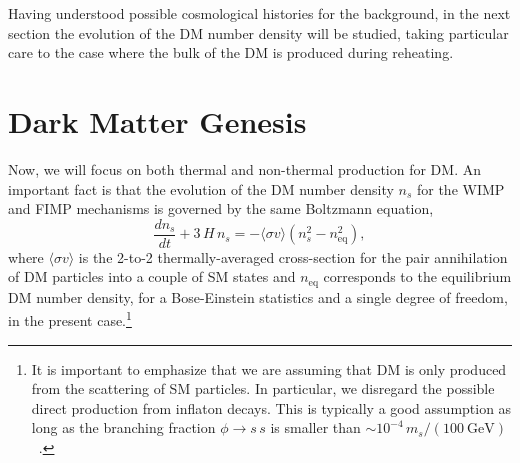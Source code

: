 \documentclass[a4paper,11pt]{article}
\newcommand{\mdm}{m_s}
\newcommand{\sv}{\langle\sigma v\rangle}
\begin{document}
Having understood possible cosmological histories for the background, in the next section the evolution of the DM number density will be studied, taking particular care to the case where the bulk of the DM is produced during reheating.

\section{Dark Matter Genesis}
\label{sec:DM_density}
Now, we will focus on both thermal and non-thermal production for DM.
An important fact is that the evolution of the DM number density $n_s$ for the WIMP and FIMP mechanisms is governed by the same Boltzmann equation,
\begin{equation} \label{eq:boltzdm}
    \dfrac{dn_s}{dt} + 3\, H\, n_s = - \sv \left(n_s^2 - n_\text{eq}^2\right),
\end{equation}
where $\sv$ is the 2-to-2 thermally-averaged cross-section for the pair annihilation of DM particles into a couple of SM states and $n_\text{eq}$ corresponds to the equilibrium DM number density, for a Bose-Einstein statistics and a single degree of freedom, in the present case.\footnote{It is important to emphasize that we are assuming that DM is only produced from the scattering of SM particles. In particular, we disregard the possible direct production from inflaton decays. This is typically a good assumption as long as the branching fraction $\phi \to s\, s$ is smaller than $\sim 10^{-4}\, \mdm/(100~\text{GeV})$~\cite{Drees:2017iod, Arias:2019uol}.}
\end{document}
